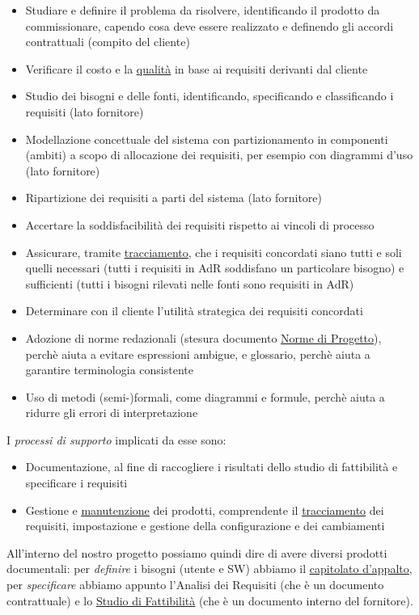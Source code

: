 			\begin{itemize}
				\item Studiare e definire il problema da risolvere, identificando il prodotto da commissionare, capendo cosa deve essere realizzato e definendo gli accordi contrattuali (compito del cliente)
				\item Verificare il costo e la \underline{\hyperref[qualita]{qualità}} in base ai requisiti derivanti dal cliente
				\item Studio dei bisogni e delle fonti, identificando, specificando e classificando i requisiti (lato fornitore)
				\item Modellazione concettuale del sistema con partizionamento in componenti (ambiti) a scopo di allocazione dei requisiti, per esempio con diagrammi d'uso (lato fornitore)
				\item Ripartizione dei requisiti a parti del sistema (lato fornitore)
				\item Accertare la soddisfacibilità dei requisiti rispetto ai vincoli di processo
				\item Assicurare, tramite \underline{\hyperref[tracciamento]{tracciamento}}, che i requisiti concordati siano tutti e soli quelli necessari (tutti i requisiti in AdR soddisfano un particolare bisogno) e sufficienti (tutti i bisogni rilevati nelle fonti sono requisiti in AdR)
				\item Determinare con il cliente l’utilità strategica dei requisiti concordati
				\item Adozione di norme redazionali (stesura documento \underline{\hyperref[norme]{Norme di Progetto}}), perchè aiuta a evitare espressioni ambigue, e glossario, perchè aiuta a garantire terminologia consistente
				\item Uso di metodi (semi-)formali, come diagrammi e formule, perchè aiuta a ridurre gli errori di interpretazione
			\end{itemize}
		I \textit{processi di supporto} implicati da esse sono:
			\begin{itemize}
				\item Documentazione, al fine di raccogliere i risultati dello studio di fattibilità e specificare i requisiti
				\item Gestione e \underline{\hyperref[manutenzione]{manutenzione}} dei prodotti, comprendente il \underline{\hyperref[tracciamento]{tracciamento}} dei requisiti, impostazione e gestione della configurazione e dei cambiamenti
			\end{itemize}
		All'interno del nostro progetto possiamo quindi dire di avere diversi prodotti documentali: per \textit{definire} i bisogni (utente e SW) abbiamo il \underline{\hyperref[capitolati]{capitolato d'appalto}}, per \textit{specificare} abbiamo appunto l'Analisi dei Requisiti (che è un documento contrattuale) e lo \underline{\hyperref[studiofattibilita]{Studio di Fattibilità}} (che è un documento interno del fornitore). \\
